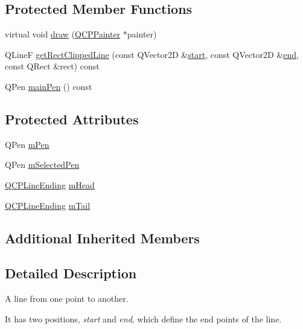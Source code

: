 \subsection*{Protected Member Functions}
\begin{DoxyCompactItemize}
\item 
virtual void \hyperlink{classQCPItemLine_a1fc045dd33919f8006df0692aeb0e84a}{draw} (\hyperlink{classQCPPainter}{Q\+C\+P\+Painter} $\ast$painter)
\item 
Q\+LineF \hyperlink{classQCPItemLine_a36e8620019a221ccea4357f0287b81c2}{get\+Rect\+Clipped\+Line} (const Q\+Vector2D \&\hyperlink{classQCPItemLine_a602da607a09498b0f152ada1d6851bc5}{start}, const Q\+Vector2D \&\hyperlink{classQCPItemLine_a15598864c1c22a2497a1979c4980c4e1}{end}, const Q\+Rect \&rect) const 
\item 
Q\+Pen \hyperlink{classQCPItemLine_a7b5bc4ebacb55774b87c91b308ca7912}{main\+Pen} () const 
\end{DoxyCompactItemize}
\subsection*{Protected Attributes}
\begin{DoxyCompactItemize}
\item 
Q\+Pen \hyperlink{classQCPItemLine_abbb544d5bb927dfe4e81a7f3ca4c65ac}{m\+Pen}
\item 
Q\+Pen \hyperlink{classQCPItemLine_aff858ad6dde3b90024814ca4b116f278}{m\+Selected\+Pen}
\item 
\hyperlink{classQCPLineEnding}{Q\+C\+P\+Line\+Ending} \hyperlink{classQCPItemLine_a51603f28ab7ddb1c1a95ea384791d3ed}{m\+Head}
\item 
\hyperlink{classQCPLineEnding}{Q\+C\+P\+Line\+Ending} \hyperlink{classQCPItemLine_ab8ed61dfe15bbb1cbf9b95eae95e242f}{m\+Tail}
\end{DoxyCompactItemize}
\subsection*{Additional Inherited Members}


\subsection{Detailed Description}
A line from one point to another. 

 It has two positions, {\itshape start} and {\itshape end}, which define the end points of the line.

